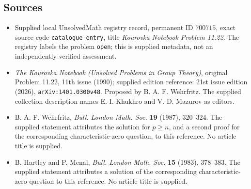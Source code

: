 \documentclass[11pt]{article}
\begin{document}
\subsection{Sources}
\begin{itemize}
\item Supplied local UnsolvedMath registry record, permanent ID \(700715\), exact source code \texttt{catalogue entry}, title \emph{Kourovka Notebook Problem 11.22}. The registry labels the problem \texttt{open}; this is supplied metadata, not an independently verified assessment.
\item \emph{The Kourovka Notebook (Unsolved Problems in Group Theory)}, original Problem 11.22, 11th issue (1990); supplied edition reference: 21st issue edition (2026), \texttt{arXiv:1401.0300v48}. Proposed by B. A. F. Wehrfritz. The supplied collection description names E. I. Khukhro and V. D. Mazurov as editors.
\item B. A. F. Wehrfritz, \emph{Bull. London Math. Soc.} \textbf{19} (1987), 320--324. The supplied statement attributes the solution for \(p\geq n\), and a second proof for the corresponding characteristic-zero question, to this reference. No article title is supplied.
\item B. Hartley and P. Menal, \emph{Bull. London Math. Soc.} \textbf{15} (1983), 378--383. The supplied statement attributes a solution of the corresponding characteristic-zero question to this reference. No article title is supplied.
\end{itemize}
\end{document}
